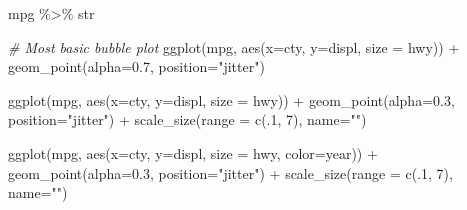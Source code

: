 \documentclass[
]{book}
\newenvironment{Shaded}{\begin{snugshade}}{\end{snugshade}}
\newcommand{\AttributeTok}[1]{\textcolor[rgb]{0.77,0.63,0.00}{#1}}
\newcommand{\CommentTok}[1]{\textcolor[rgb]{0.56,0.35,0.01}{\textit{#1}}}
\newcommand{\DecValTok}[1]{\textcolor[rgb]{0.00,0.00,0.81}{#1}}
\newcommand{\FloatTok}[1]{\textcolor[rgb]{0.00,0.00,0.81}{#1}}
\newcommand{\FunctionTok}[1]{\textcolor[rgb]{0.00,0.00,0.00}{#1}}
\newcommand{\NormalTok}[1]{#1}
\newcommand{\SpecialCharTok}[1]{\textcolor[rgb]{0.00,0.00,0.00}{#1}}
\newcommand{\StringTok}[1]{\textcolor[rgb]{0.31,0.60,0.02}{#1}}
\begin{document}
\begin{Shaded}
\begin{Highlighting}[]
\NormalTok{mpg }\SpecialCharTok{\%\textgreater{}\%}\NormalTok{ str}

\CommentTok{\# Most basic bubble plot}
\FunctionTok{ggplot}\NormalTok{(mpg, }\FunctionTok{aes}\NormalTok{(}\AttributeTok{x=}\NormalTok{cty, }\AttributeTok{y=}\NormalTok{displ, }\AttributeTok{size =}\NormalTok{ hwy)) }\SpecialCharTok{+}
  \FunctionTok{geom\_point}\NormalTok{(}\AttributeTok{alpha=}\FloatTok{0.7}\NormalTok{, }\AttributeTok{position=}\StringTok{"jitter"}\NormalTok{) }
\end{Highlighting}
\end{Shaded}

\begin{Shaded}
\begin{Highlighting}[]
\FunctionTok{ggplot}\NormalTok{(mpg, }\FunctionTok{aes}\NormalTok{(}\AttributeTok{x=}\NormalTok{cty, }\AttributeTok{y=}\NormalTok{displ, }\AttributeTok{size =}\NormalTok{ hwy)) }\SpecialCharTok{+}
  \FunctionTok{geom\_point}\NormalTok{(}\AttributeTok{alpha=}\FloatTok{0.3}\NormalTok{, }\AttributeTok{position=}\StringTok{"jitter"}\NormalTok{) }\SpecialCharTok{+}
  \FunctionTok{scale\_size}\NormalTok{(}\AttributeTok{range =} \FunctionTok{c}\NormalTok{(.}\DecValTok{1}\NormalTok{, }\DecValTok{7}\NormalTok{), }\AttributeTok{name=}\StringTok{""}\NormalTok{)}
\end{Highlighting}
\end{Shaded}

\begin{Shaded}
\begin{Highlighting}[]
\FunctionTok{ggplot}\NormalTok{(mpg, }\FunctionTok{aes}\NormalTok{(}\AttributeTok{x=}\NormalTok{cty, }\AttributeTok{y=}\NormalTok{displ, }\AttributeTok{size =}\NormalTok{ hwy, }\AttributeTok{color=}\NormalTok{year)) }\SpecialCharTok{+}
  \FunctionTok{geom\_point}\NormalTok{(}\AttributeTok{alpha=}\FloatTok{0.3}\NormalTok{, }\AttributeTok{position=}\StringTok{"jitter"}\NormalTok{) }\SpecialCharTok{+}
  \FunctionTok{scale\_size}\NormalTok{(}\AttributeTok{range =} \FunctionTok{c}\NormalTok{(.}\DecValTok{1}\NormalTok{, }\DecValTok{7}\NormalTok{), }\AttributeTok{name=}\StringTok{""}\NormalTok{)}
\end{Highlighting}
\end{Shaded}
\end{document}
